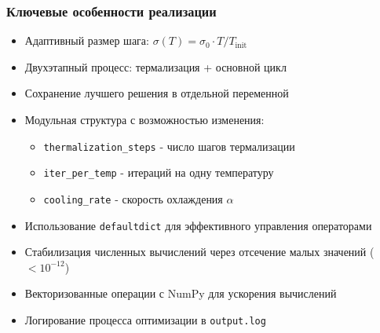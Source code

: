 \documentclass[a4paper]{report}
\begin{document}
\subsubsection{Ключевые особенности реализации}
\begin{itemize}
    \item Адаптивный размер шага: $\sigma(T) = \sigma_0 \cdot T/T_{\text{init}}$
    \item Двухэтапный процесс: термализация + основной цикл
    \item Сохранение лучшего решения в отдельной переменной
    \item Модульная структура с возможностью изменения:
      \begin{itemize}
      \item \texttt{thermalization\_steps} - число шагов термализации
      \item \texttt{iter\_per\_temp} - итераций на одну температуру
      \item \texttt{cooling\_rate} - скорость охлаждения $\alpha$
      \end{itemize}
    \item Использование \texttt{defaultdict} для эффективного управления операторами
    \item Стабилизация численных вычислений через отсечение малых значений ($<10^{-12}$)
    \item Векторизованные операции с NumPy для ускорения вычислений
    \item Логирование процесса оптимизации в \texttt{output.log}
\end{itemize}


\end{document}
